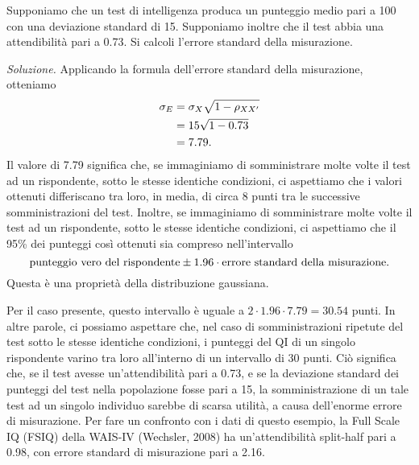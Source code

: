 \begin{exmp}
Supponiamo che un test di intelligenza produca un punteggio medio pari a 100
con una deviazione standard di 15.  
Supponiamo inoltre che il test abbia una attendibilità pari a 0.73.
Si calcoli l'errore standard della misurazione.

\medskip

\emph{Soluzione.}
Applicando la formula dell'errore standard della misurazione, otteniamo
\begin{align}
\sigma_E &= \sigma_X \sqrt{1 -\rho_{XX'}} \notag\\
&= 15 \sqrt{1 - 0.73} \notag\\
&= 7.79.\notag
\end{align}
Il valore di 7.79 significa che, se immaginiamo di somministrare molte volte il test ad un rispondente, sotto le stesse identiche condizioni, ci aspettiamo che i valori ottenuti differiscano tra loro, in media, di circa 8 punti tra le successive somministrazioni del test. 
Inoltre, se immaginiamo di somministrare molte volte il test ad un rispondente, sotto le stesse identiche condizioni, ci aspettiamo che il 95\% dei punteggi così ottenuti sia compreso nell'intervallo
\begin{equation}
\text{punteggio vero del rispondente} \pm 1.96 \cdot \text{errore standard della misurazione}. \notag
\end{equation}
Questa è una proprietà della distribuzione gaussiana.

Per il caso presente, questo intervallo è uguale a
$
2 \cdot 1.96 \cdot 7.79 = 30.54
$ punti.
In altre parole, ci possiamo aspettare che, nel caso di somministrazioni ripetute del test sotto le stesse identiche condizioni, i punteggi del QI di un singolo rispondente varino tra loro all'interno di un intervallo di 30 punti.  Ciò significa che, se il test avesse un'attendibilità pari a 0.73, e se la deviazione standard dei punteggi del test nella popolazione fosse pari a 15, la somministrazione di un tale test ad un singolo individuo sarebbe di scarsa utilità, a causa dell'enorme errore di misurazione. 
Per fare un confronto con i dati di questo esempio, la Full Scale IQ (FSIQ) della WAIS-IV (Wechsler, 2008) ha un'attendibilità split-half pari a 0.98, con errore standard di misurazione pari a 2.16.

\end{exmp}


